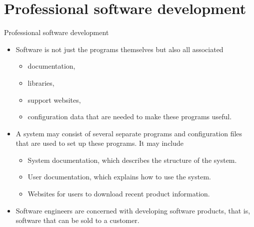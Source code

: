 \documentclass{beamer}
\begin{document}
\section{Professional software development}
\begin{frame}{Professional software development}
	\begin{itemize}
		\item Software is not just the programs themselves but also all associated 
		\begin{itemize}
			\item documentation, 
			\item libraries, 
			\item support websites,
			\item configuration data that are needed to make these programs useful.
		\end{itemize}
	\item A system may consist of several separate programs and configuration files that are    used to set up these programs. It may include 
	\begin{itemize}
		\item System documentation, which describes the structure of the system. 
		\item User documentation, which explains how to use the system.
		\item Websites for users to download recent product information.
	
	\end{itemize}
	\item Software engineers are concerned with developing software products, that is, software      that can be sold to a customer. 
	\end{itemize}
\end{frame}
\end{document}
